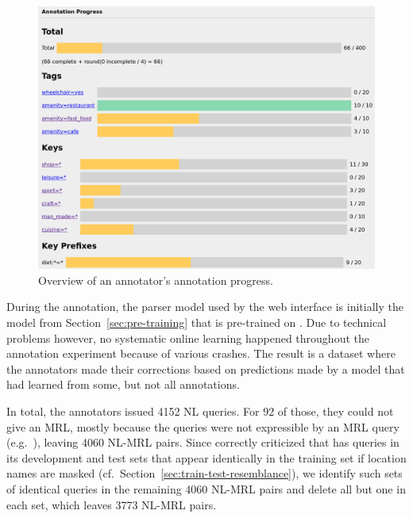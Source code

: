 \begin{figure}[h]
  \centering
  \includegraphics[width=\textwidth]{fig/annotation_progress.png}
  \caption[Annotation progress overview]{Overview of an annotator’s annotation
    progress.}
  \label{fig:annotation-progress}
\end{figure}

During the annotation, the parser model used by the web interface is initially
the model from Section~\ref{sec:pre-training} that is pre-trained on
\nlmapsthree{}. Due to technical problems however, no systematic online learning
happened throughout the annotation experiment because of various crashes. The
result is a dataset where the annotators made their corrections based on
predictions made by a model that had learned from some, but not all annotations.

In total, the annotators issued \num{4152} NL queries. For \num{92} of those,
they could not give an MRL, mostly because the queries were not expressible by
an MRL query (e.g.\ ), leaving \num{4060}
NL-MRL pairs. Since \textcite{staniek-2020} correctly criticized that
\nlmapstwo{} has queries in its development and test sets that appear
identically in the training set if location names are masked (cf.\
Section~\ref{sec:train-test-resemblance}), we identify such sets of identical
queries in the remaining \num{4060} NL-MRL pairs and delete all but one in each
set, which leaves \num{3773} NL-MRL pairs.

